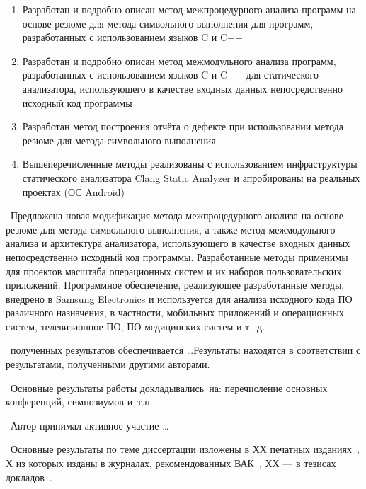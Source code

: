 \novelty
\begin{enumerate}
  \item Разработан и подробно описан метод межпроцедурного анализа программ на основе резюме для метода символьного выполнения для программ, разработанных с использованием языков C и C++
  \item Разработан и подробно описан метод межмодульного анализа программ, разработанных с использованием языков C и C++ для статического анализатора, использующего в качестве входных данных непосредственно исходный код программы
  \item Разработан метод построения отчёта о дефекте при использовании метода резюме для метода символьного выполнения
  \item Вышеперечисленные методы реализованы с использованием инфраструктуры статического анализатора Clang Static Analyzer и апробированы на реальных проектах (ОС Android)
\end{enumerate}

\influence\ Предложена новая модификация метода межпроцедурного анализа на основе резюме для метода символьного выполнения, а также метод межмодульного анализа и архитектура анализатора, использующего в качестве входных данных непосредственно исходный код программы. Разработанные методы применимы для проектов масштаба операционных систем и их наборов пользовательских приложений. Программное обеспечение, реализующее разработанные методы, внедрено в Samsung Electronics и используется для анализа исходного кода ПО различного назначения, в частности, мобильных приложений и операционных систем, телевизионное ПО, ПО медицинских систем и т.~д.

\reliability\ полученных результатов обеспечивается \ldots Результаты находятся в соответствии с результатами, полученными другими авторами.

\probation\
Основные результаты работы докладывались~на:
перечисление основных конференций, симпозиумов и~т.\:п.

\contribution\ Автор принимал активное участие \ldots

\publications\ Основные результаты по теме диссертации изложены в ХХ печатных изданиях~\cite{summary-impl-mine,summary-intro-mine,summary-inter-unit-mine},
Х из которых изданы в журналах, рекомендованных ВАК~\cite{summary-impl-mine,summary-intro-mine,summary-inter-unit-mine}, 
ХХ --- в тезисах докладов~\cite{Lermontov,Management}.
